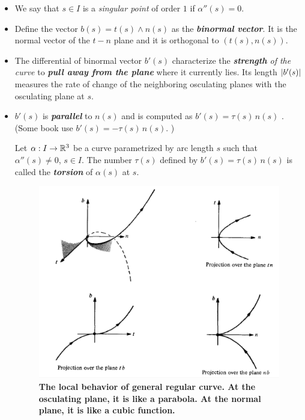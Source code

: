 \documentclass[11pt]{article}
\begin{document}
\begin{itemize}
\item We say that $s \in I$ is a \emph{singular point} of order $1$ if $\alpha''(s) = 0$.

\item Define the vector $b(s) = t(s) \wedge n(s)$ as the \emph{\textbf{binormal vector}}. It is the normal vector of the $t-n$ plane and it is orthogonal to $(t(s), n(s))$. 

\item The differential of binormal vector $b'(s)$ characterize the \emph{\textbf{strength} of the curve} to \emph{\textbf{pull away from the plane}} where it currently lies. Its length $\left\lvert b'(s) \right\rvert$ measures the rate of change of the neighboring osculating planes with the osculating plane at $s$.

\item  $b'(s)$ is \emph{\textbf{parallel}} to $n(s)$ and is computed as $b'(s) = \tau(s)\,n(s)$ \citep{do1976differential}. (Some book use $b'(s) = -\tau(s)\,n(s)$. )

\begin{definition}
Let $\alpha: I \rightarrow {\mathbb R}^3$ be a curve parametrized by arc length $s$ such that $\alpha''(s) \neq 0$, $s \in I$. The number $\tau(s)$ defined by $b'(s) = \tau(s)\,n(s)$ is called the \emph{\textbf{torsion}} of $\alpha(s)$ at $s$.
\end{definition}

\begin{figure}[tb]
\begin{minipage}{0.7\linewidth}
 \centerline{\includegraphics[scale = 0.5]{Frenet_trihedron.png}}
\end{minipage}
\caption{\scriptsize
\textbf{The local behavior of general regular curve. At the osculating plane, it is like a parabola. At the normal plane, it is like a cubic function. }}
\label{fig: Frenet_trihedron}
\end{figure}


\end{itemize}
\end{document}
